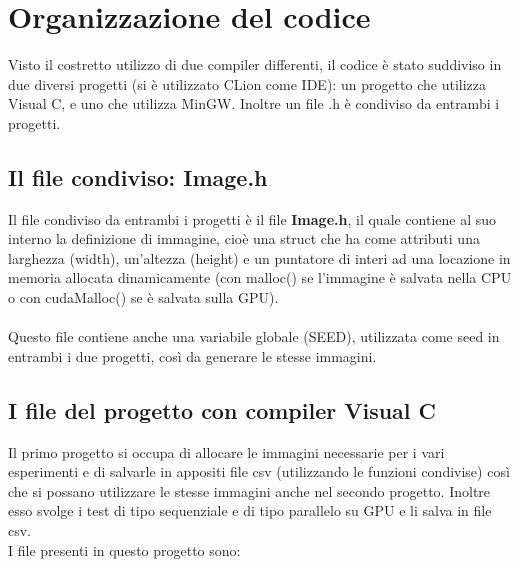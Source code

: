 \documentclass[10pt,twocolumn,letterpaper]{article}
\begin{document}
\section{Organizzazione del codice}

Visto il costretto utilizzo di due compiler differenti, il codice è stato suddiviso in due diversi progetti (si è utilizzato CLion come IDE): un progetto che utilizza Visual C, e uno che utilizza MinGW. Inoltre un file .h è condiviso da entrambi i progetti.


\subsection{Il file condiviso: Image.h}

Il file condiviso da entrambi i progetti è il file \textbf{Image.h}, il quale contiene al suo interno la definizione di immagine, cioè una struct che ha come attributi una larghezza (width), un’altezza (height) e un puntatore di interi ad una locazione in memoria allocata dinamicamente (con malloc() se l’immagine è salvata nella CPU o con cudaMalloc() se è salvata sulla GPU).\\
\\
Questo file contiene anche una variabile globale (SEED), utilizzata come seed in entrambi i due progetti, così da generare le stesse immagini.


\subsection{I file del progetto con compiler Visual C}

Il primo progetto si occupa di allocare le immagini necessarie per i vari esperimenti e di salvarle in appositi file csv (utilizzando le funzioni condivise) così che si possano utilizzare le stesse immagini anche nel secondo progetto. Inoltre esso svolge i test di tipo sequenziale e di tipo parallelo su GPU e li salva in file csv.\\
I file presenti in questo progetto sono:
\end{document}
